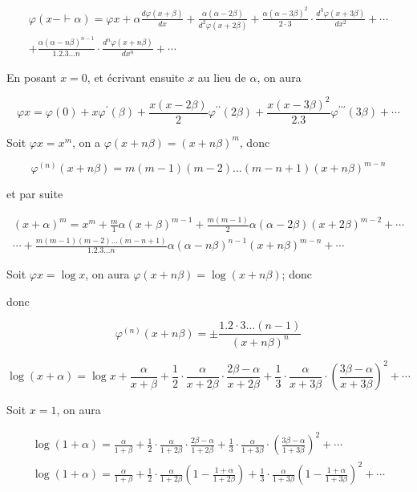 \documentclass{article}
\begin{document}
\[
\begin{gathered}
\varphi(x-\vdash \alpha)=\varphi x+\alpha \frac{d \varphi(x+\beta)}{d x}+\frac{\alpha(\alpha-2 \beta)}{d^{2} \varphi(x+2 \beta)}+\frac{\alpha(\alpha-3 \beta)^{2}}{2 \cdot 3} \cdot \frac{d^{3} \varphi(x+3 \beta)}{d x^{2}}+\cdots \\
+\frac{\alpha(\alpha-n \beta)^{n-1}}{1.2 .3 \ldots n} \cdot \frac{d^{n} \varphi(x+n \beta)}{d x^{n}}+\cdots
\end{gathered}
\]

En posant \(x=0\), et écrivant ensuite \(x\) au lieu de \(\alpha\), on aura

\[
\varphi x=\varphi(0)+x \varphi^{\prime}(\beta)+\frac{x(x-2 \beta)}{2} \varphi^{\prime \prime}(2 \beta)+\frac{x(x-3 \beta)^{2}}{2.3} \varphi^{\prime \prime \prime}(3 \beta)+\cdots
\]

Soit \(\varphi x=x^{m}\), on a \(\varphi(x+n \beta)=(x+n \beta)^{m}\), donc

\[
\varphi^{(n)}(x+n \beta)=m(m-1)(m-2) \ldots(m-n+1)(x+n \beta)^{m-n}
\]

et par suite

\[
\begin{gathered}
(x+\alpha)^{m}=x^{m}+\frac{m}{1} \alpha(x+\beta)^{m-1}+\frac{m(m-1)}{2} \alpha(\alpha-2 \beta)(x+2 \beta)^{m-2}+\cdots \\
\cdots+\frac{m(m-1)(m-2) \ldots(m-n+1)}{1.2 .3 \ldots n} \alpha(\alpha-n \beta)^{n-1}(x+n \beta)^{m-n}+\cdots
\end{gathered}
\]

Soit \(\varphi x=\log x\), on aura \(\varphi(x+n \beta)=\log (x+n \beta)\); donc

donc

\[
\varphi^{(n)}(x+n \beta)= \pm \frac{1.2 \cdot 3 \ldots(n-1)}{(x+n \beta)^{n}}
\]

\[
\log (x+\alpha)=\log x+\frac{\alpha}{x+\beta}+\frac{1}{2} \cdot \frac{\alpha}{x+2 \beta} \cdot \frac{2 \beta-\alpha}{x+2 \beta}+\frac{1}{3} \cdot \frac{\alpha}{x+3 \beta} \cdot\left(\frac{3 \beta-\alpha}{x+3 \beta}\right)^{2}+\cdots
\]

Soit \(x=1\), on aura

\[
\begin{gathered}
\log (1+\alpha)=\frac{\alpha}{1+\beta}+\frac{1}{2} \cdot \frac{\alpha}{1+2 \beta} \cdot \frac{2 \beta-\alpha}{1+2 \beta}+\frac{1}{3} \cdot \frac{\alpha}{1+3 \beta} \cdot\left(\frac{3 \beta-\alpha}{1+3 \beta}\right)^{2}+\cdots \\
\log (1+\alpha)=\frac{\alpha}{1+\beta}+\frac{1}{2} \cdot \frac{\alpha}{1+2 \beta}\left(1-\frac{1+\alpha}{1+2 \beta}\right)+\frac{1}{3} \cdot \frac{\alpha}{1+3 \beta}\left(1-\frac{1+\alpha}{1+3 \beta}\right)^{2}+\cdots
\end{gathered}
\]
\end{document}

